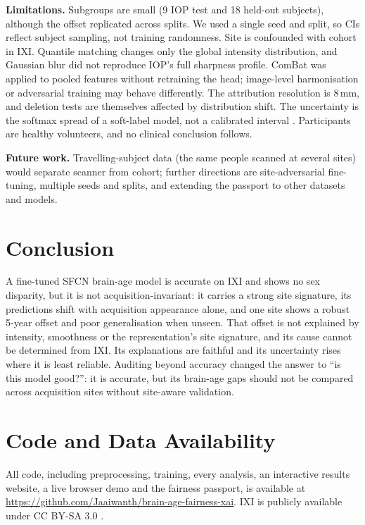 \documentclass[conference]{IEEEtran}
\begin{document}
\textbf{Limitations.} Subgroups are small (9 IOP test and 18 held-out subjects), although the offset replicated across splits. We used a single seed and split, so CIs reflect subject sampling, not training randomness. Site is confounded with cohort in IXI. Quantile matching changes only the global intensity distribution, and Gaussian blur did not reproduce IOP's full sharpness profile. ComBat was applied to pooled features without retraining the head; image-level harmonisation or adversarial training \cite{dinsdale2021unlearning} may behave differently. The attribution resolution is 8\,mm, and deletion tests are themselves affected by distribution shift. The uncertainty is the softmax spread of a soft-label model, not a calibrated interval \cite{guo2017calibration}. Participants are healthy volunteers, and no clinical conclusion follows.

\textbf{Future work.} Travelling-subject data (the same people scanned at several sites) would separate scanner from cohort; further directions are site-adversarial fine-tuning, multiple seeds and splits, and extending the passport to other datasets and models.

\section{Conclusion}
A fine-tuned SFCN brain-age model is accurate on IXI and shows no sex disparity, but it is not acquisition-invariant: it carries a strong site signature, its predictions shift with acquisition appearance alone, and one site shows a robust 5-year offset and poor generalisation when unseen. That offset is not explained by intensity, smoothness or the representation's site signature, and its cause cannot be determined from IXI. Its explanations are faithful and its uncertainty rises where it is least reliable. Auditing beyond accuracy changed the answer to ``is this model good?'': it is accurate, but its brain-age gaps should not be compared across acquisition sites without site-aware validation.

\section*{Code and Data Availability}
All code, including preprocessing, training, every analysis, an interactive results website, a live browser demo and the fairness passport, is available at \url{https://github.com/Jaaiwanth/brain-age-fairness-xai}. IXI is publicly available under CC BY-SA 3.0 \cite{ixi}.
\end{document}

